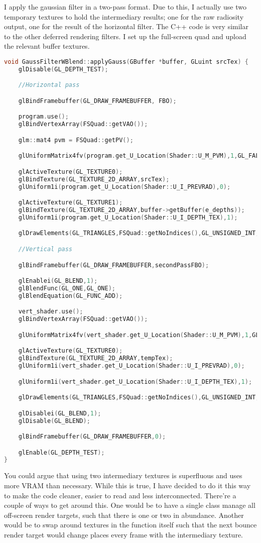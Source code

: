 I apply the gaussian filter in a two-pass format. Due to this, I actually use two temporary textures to hold the intermediary results; one for the raw radiosity output, one for the result of the horizontal filter. The C++ code is very similar to the other deferred rendering filters. I set up the full-screen quad and upload the relevant buffer textures.
\begin{lstlisting}[caption={Filters.cpp},language=c++]
void GaussFilterWBlend::applyGauss(GBuffer *buffer, GLuint srcTex) {
	glDisable(GL_DEPTH_TEST);

	//Horizontal pass

	glBindFramebuffer(GL_DRAW_FRAMEBUFFER, FBO);

	program.use();
	glBindVertexArray(FSQuad::getVAO());

	glm::mat4 pvm = FSQuad::getPV();

	glUniformMatrix4fv(program.get_U_Location(Shader::U_M_PVM),1,GL_FALSE,glm::value_ptr(pvm));

	glActiveTexture(GL_TEXTURE0);
	glBindTexture(GL_TEXTURE_2D_ARRAY,srcTex);
	glUniform1i(program.get_U_Location(Shader::U_I_PREVRAD),0);

	glActiveTexture(GL_TEXTURE1);
	glBindTexture(GL_TEXTURE_2D_ARRAY,buffer->getBuffer(e_depths));
	glUniform1i(program.get_U_Location(Shader::U_I_DEPTH_TEX),1);

	glDrawElements(GL_TRIANGLES,FSQuad::getNoIndices(),GL_UNSIGNED_INT,(void*) 0);

	//Vertical pass

	glBindFramebuffer(GL_DRAW_FRAMEBUFFER,secondPassFBO);

	glEnablei(GL_BLEND,1);
	glBlendFunc(GL_ONE,GL_ONE);
	glBlendEquation(GL_FUNC_ADD);

	vert_shader.use();
	glBindVertexArray(FSQuad::getVAO());

	glUniformMatrix4fv(vert_shader.get_U_Location(Shader::U_M_PVM),1,GL_FALSE,glm::value_ptr(pvm));

	glActiveTexture(GL_TEXTURE0);
	glBindTexture(GL_TEXTURE_2D_ARRAY,tempTex);
	glUniform1i(vert_shader.get_U_Location(Shader::U_I_PREVRAD),0);

	glUniform1i(vert_shader.get_U_Location(Shader::U_I_DEPTH_TEX),1);

	glDrawElements(GL_TRIANGLES,FSQuad::getNoIndices(),GL_UNSIGNED_INT,(void*) 0);

	glDisablei(GL_BLEND,1);
	glDisable(GL_BLEND);

	glBindFramebuffer(GL_DRAW_FRAMEBUFFER,0);

	glEnable(GL_DEPTH_TEST);
}
\end{lstlisting}
You could argue that using two intermediary textures is superfluous and uses more VRAM than necessary. While this is true, I have decided to do it this way to make the code cleaner, easier to read and less interconnected. There're a couple of ways to get around this. One would be to have a single class manage all off-screen render targets, such that there is one or two in abundance. Another would be to swap around textures in the function itself such that the next bounce render target would change places every frame with the intermediary texture.

